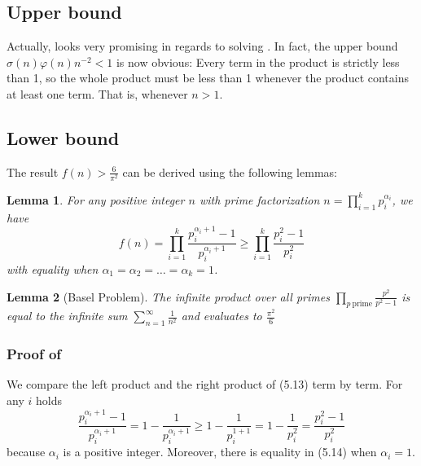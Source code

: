 \documentclass[a4paper, 12pt]{article}
\newtheorem{lemma}{Lemma}
\theoremstyle{definition}
\begin{document}
\subsection{Upper bound}
Actually, \textbf{} looks very promising in regards to solving \textbf{}.
In fact, the upper bound $\sigma(n)\varphi(n) n^{-2}<1$ is now obvious:
Every term in the product is strictly less than 1, so the whole product must be less than
1 whenever the product contains at least one term.
That is, whenever $n>1$.

\subsection{Lower bound}
The result $f(n)>\frac{6}{\pi^2}$ can be derived using the following lemmas:

\vspace{1em}\begin{lemma}\label{lemma:fl1}
  For any positive integer $n$ with prime factorization $n = \prod_{i=1}^{k} p_i^{\alpha_i}$, we have
  \begin{equation}
    f(n)=\prod_{i=1}^{k} \frac{p_i^{\alpha_i+1}-1}{p_i^{\alpha_i+1}} \geq \prod_{i=1}^{k} \frac{p_i^2-1}{p_i^2}
  \end{equation}
  with equality when $\alpha_1 = \alpha_2 = \dots = \alpha_k = 1$.
\end{lemma}
\vspace{1em}
\begin{lemma}[Basel Problem]\label{lemma:fl2}
  The infinite product over all primes
  $\displaystyle \prod_{p\ \text{prime}} \frac{p^2}{p^2-1}$
  is equal to the infinite sum
  $\displaystyle \sum_{n=1}^{\infty}\frac{1}{n^2}$
  and evaluates to $\displaystyle \frac{\pi^2}{6}$
\end{lemma}\vspace{1em}

\subsubsection*{Proof of }
We compare the left product and the right product of (5.13) term by term.
For any $i$ holds
\begin{equation}
  \frac{p_i^{\alpha_i+1}-1}{p_i^{\alpha_i+1}} = 1 - \frac{1}{p_i^{\alpha_i+1}}
  \geq 1 - \frac{1}{p_i^{1+1}} = 1 - \frac{1}{p_i^2} = \frac{p_i^2-1}{p_i^2}
\end{equation}
because $\alpha_i$ is a positive integer.
Moreover, there is equality in (5.14) when $\alpha_i = 1$.
\end{document}
